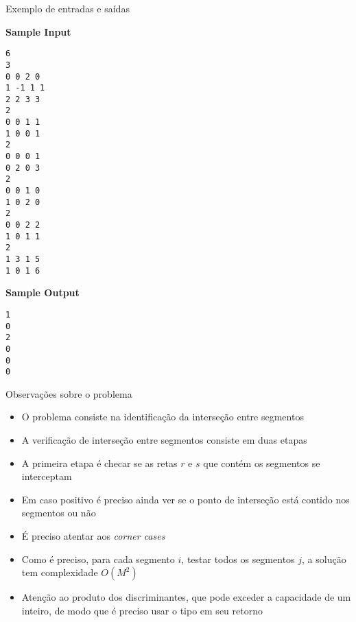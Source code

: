 \begin{frame}[fragile]{Exemplo de entradas e saídas}

\begin{scriptsize}
\begin{minipage}[t]{0.5\textwidth}
\textbf{Sample Input}
\begin{verbatim}
6
3
0 0 2 0
1 -1 1 1
2 2 3 3
2
0 0 1 1
1 0 0 1
2
0 0 0 1
0 2 0 3
2
0 0 1 0
1 0 2 0
2
0 0 2 2
1 0 1 1
2
1 3 1 5
1 0 1 6
\end{verbatim}
\end{minipage}
\begin{minipage}[t]{0.45\textwidth}
\textbf{Sample Output}
\begin{verbatim}
1
0
2
0
0
0
\end{verbatim}
\end{minipage}
\end{scriptsize}

\end{frame}

\begin{frame}[fragile]{Observações sobre o problema}

    \begin{itemize}
        \item O problema consiste na identificação da interseção entre segmentos
        \pause

        \item A verificação de interseção entre segmentos consiste em duas etapas
        \pause

        \item A primeira etapa é checar se as retas $r$ e $s$ que contém os segmentos se
            interceptam
        \pause

        \item Em caso positivo é preciso ainda ver se o ponto de interseção está contido nos 
            segmentos ou não
        \pause

        \item É preciso atentar aos \textit{corner cases}
        \pause

        \item Como é preciso, para cada segmento $i$,  testar todos os segmentos $j$, a
            solução tem complexidade $O(M^2)$
        \pause

        \item Atenção ao produto dos discriminantes, que pode exceder a capacidade de um
            inteiro, de modo que é preciso usar o tipo  em seu retorno
    \end{itemize}

\end{frame}

